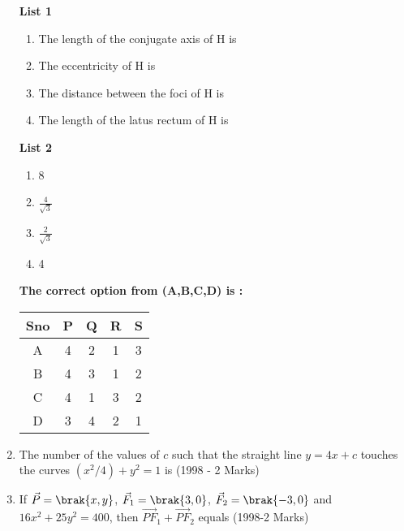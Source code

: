 \begin{enumerate}
\begin{multicols}{2}
\textbf{List 1}
\begin{enumerate}
    \item The length of the conjugate axis of H is
    \item The eccentricity of H is
    \item The distance between the foci of H is
    \item The length of the latus rectum of H is
\end{enumerate}
\columnbreak


\textbf{List 2}
\begin{enumerate}
    \item 8
    \item $\frac{4}{\sqrt{3}}$
    \item $\frac{2}{\sqrt{3}}$
    \item 4

\end{enumerate}
\end{multicols}
\textbf{The correct option from (A,B,C,D) is :}

\begin{table}[h]
\centering

\begin{tabular}{|c|c|c|c|c|}
\hline
Sno & P & Q & R & S \\ \hline
A & 4 & 2 & 1 & 3 \\ \hline
B & 4 & 3 & 1 & 2 \\ \hline
C & 4 & 1 & 3 & 2 \\ \hline
D & 3 & 4 & 2 & 1 \\ \hline
\end{tabular}
\end{table}
    \item The number of the values of $c$ such that the straight line $y=4x+c$ touches the curves $(x^2/4)+y^2=1$ is \hfill(1998 - 2 Marks)\\
	\begin{enumerate}
	\end{enumerate}

\item If $\vec{P}=\brak{x,y}$, $\vec{F}_{1}=\brak{3,0}$, $\vec{F}_{2}=\brak{-3,0}$ and $16x^2+25y^2=400$, then $\vec{PF}_{1}+\vec{PF}_{2}$ equals \hfill(1998-2 Marks)\\
	\begin{enumerate}
			\begin{multicols}{2}
		\item $8$
		\item $6$
			\columnbreak
		\item $10$
		\item $12$
			\end{multicols}
	\end{enumerate}


\end{enumerate}

